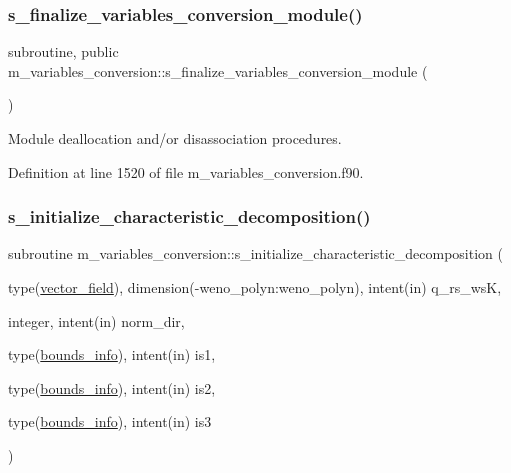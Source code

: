 \subsubsection{\texorpdfstring{s\+\_\+finalize\+\_\+variables\+\_\+conversion\+\_\+module()}{s\_finalize\_variables\_conversion\_module()}}
{\footnotesize\ttfamily subroutine, public m\+\_\+variables\+\_\+conversion\+::s\+\_\+finalize\+\_\+variables\+\_\+conversion\+\_\+module (\begin{DoxyParamCaption}{ }\end{DoxyParamCaption})}



Module deallocation and/or disassociation procedures. 



Definition at line 1520 of file m\+\_\+variables\+\_\+conversion.\+f90.

\mbox{\label{namespacem__variables__conversion_a3ca1b002fc78b7faad2f8638e4a42f9a}} 
\subsubsection{\texorpdfstring{s\+\_\+initialize\+\_\+characteristic\+\_\+decomposition()}{s\_initialize\_characteristic\_decomposition()}}
{\footnotesize\ttfamily subroutine m\+\_\+variables\+\_\+conversion\+::s\+\_\+initialize\+\_\+characteristic\+\_\+decomposition (\begin{DoxyParamCaption}\item[{type(\hyperlink{structm__derived__types_1_1vector__field}{vector\+\_\+field}), dimension(-\/weno\+\_\+polyn\+:weno\+\_\+polyn), intent(in)}]{q\+\_\+rs\+\_\+wsK,  }\item[{integer, intent(in)}]{norm\+\_\+dir,  }\item[{type(\hyperlink{structm__derived__types_1_1bounds__info}{bounds\+\_\+info}), intent(in)}]{is1,  }\item[{type(\hyperlink{structm__derived__types_1_1bounds__info}{bounds\+\_\+info}), intent(in)}]{is2,  }\item[{type(\hyperlink{structm__derived__types_1_1bounds__info}{bounds\+\_\+info}), intent(in)}]{is3 }\end{DoxyParamCaption})}



